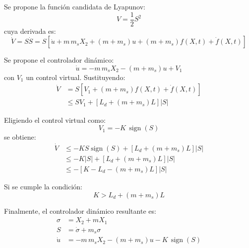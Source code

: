 \begin{enumerate}
\begin{itemize}
        Se propone la función candidata de Lyapunov:
        \begin{equation*}
            V = \frac{1}{2}S^2
        \end{equation*}
        cuya derivada es:
        \begin{equation*}
            \dot{V} = S\dot{S} = S\left[\dot{u} + m\,m_s X_2 + (m+m_s)u + (m+m_s)f(X,t) + \dot{f}(X,t)\right]
        \end{equation*}

        Se propone el controlador dinámico:
        \begin{equation*}
            \dot{u} = -m\,m_s X_2 - (m+m_s)u + V_1
        \end{equation*}
        con $V_1$ un control virtual. Sustituyendo:
        \begin{equation*}
            \begin{aligned}
                \dot{V} &= S\left[V_1 + (m+m_s)f(X,t) + \dot{f}(X,t)\right] \\
                &\le S V_1 + \left[L_d + (m+m_s)L\right]|S|
            \end{aligned}
        \end{equation*}

        Eligiendo el control virtual como:
        \begin{equation*}
            V_1 = -K\,\operatorname{sign}(S)
        \end{equation*}
        se obtiene:
        \begin{equation*}
            \begin{aligned}
                \dot{V} &\le -K S\operatorname{sign}(S) + \left[L_d + (m+m_s)L\right]|S| \\
                &\le -K|S| + \left[L_d + (m+m_s)L\right]|S| \\
                &\le -\left[K - L_d - (m+m_s)L\right]|S|
            \end{aligned}
        \end{equation*}

        Si se cumple la condición:
        \begin{equation*}
            K > L_d + (m+m_s)L
        \end{equation*}

        Finalmente, el controlador dinámico resultante es:
        \begin{equation*}
            \begin{aligned}
                \sigma &= X_2 + m X_1 \\
                S &= \dot{\sigma} + m_s\sigma \\
                \dot{u} &= -m\,m_s X_2 - (m+m_s)u - K\,\operatorname{sign}(S)
            \end{aligned}
        \end{equation*}


\end{itemize}
\end{enumerate}
